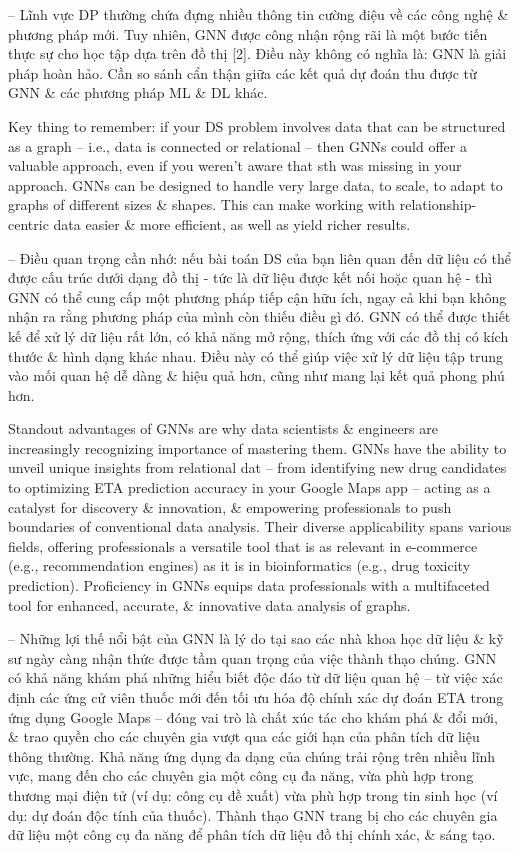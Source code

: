 \documentclass{article}
\begin{document}
\begin{itemize}
    -- Lĩnh vực DP thường chứa đựng nhiều thông tin cường điệu về các công nghệ \& phương pháp mới. Tuy nhiên, GNN được công nhận rộng rãi là một bước tiến thực sự cho học tập dựa trên đồ thị [2]. Điều này không có nghĩa là: GNN là giải pháp hoàn hảo. Cần so sánh cẩn thận giữa các kết quả dự đoán thu được từ GNN \& các phương pháp ML \& DL khác.

    Key thing to remember: if your DS problem involves data that can be structured as a graph -- i.e., data is connected or relational -- then GNNs could offer a valuable approach, even if you weren't aware that sth was missing in your approach. GNNs can be designed to handle very large data, to scale, to adapt to graphs of different sizes \& shapes. This can make working with relationship-centric data easier \& more efficient, as well as yield richer results.

    -- Điều quan trọng cần nhớ: nếu bài toán DS của bạn liên quan đến dữ liệu có thể được cấu trúc dưới dạng đồ thị - tức là dữ liệu được kết nối hoặc quan hệ - thì GNN có thể cung cấp một phương pháp tiếp cận hữu ích, ngay cả khi bạn không nhận ra rằng phương pháp của mình còn thiếu điều gì đó. GNN có thể được thiết kế để xử lý dữ liệu rất lớn, có khả năng mở rộng, thích ứng với các đồ thị có kích thước \& hình dạng khác nhau. Điều này có thể giúp việc xử lý dữ liệu tập trung vào mối quan hệ dễ dàng \& hiệu quả hơn, cũng như mang lại kết quả phong phú hơn.

    Standout advantages of GNNs are why data scientists \& engineers are increasingly recognizing importance of mastering them. GNNs have the ability to unveil unique insights from relational dat -- from identifying new drug candidates to optimizing ETA prediction accuracy in your Google Maps app -- acting as a catalyst for discovery \& innovation, \& empowering professionals to push boundaries of conventional data analysis. Their diverse applicability spans various fields, offering professionals a versatile tool that is as relevant in e-commerce (e.g., recommendation engines) as it is in bioinformatics (e.g., drug toxicity prediction). Proficiency in GNNs equips data professionals with a multifaceted tool for enhanced, accurate, \& innovative data analysis of graphs.

    -- Những lợi thế nổi bật của GNN là lý do tại sao các nhà khoa học dữ liệu \& kỹ sư ngày càng nhận thức được tầm quan trọng của việc thành thạo chúng. GNN có khả năng khám phá những hiểu biết độc đáo từ dữ liệu quan hệ -- từ việc xác định các ứng cử viên thuốc mới đến tối ưu hóa độ chính xác dự đoán ETA trong ứng dụng Google Maps -- đóng vai trò là chất xúc tác cho khám phá \& đổi mới, \& trao quyền cho các chuyên gia vượt qua các giới hạn của phân tích dữ liệu thông thường. Khả năng ứng dụng đa dạng của chúng trải rộng trên nhiều lĩnh vực, mang đến cho các chuyên gia một công cụ đa năng, vừa phù hợp trong thương mại điện tử (ví dụ: công cụ đề xuất) vừa phù hợp trong tin sinh học (ví dụ: dự đoán độc tính của thuốc). Thành thạo GNN trang bị cho các chuyên gia dữ liệu một công cụ đa năng để phân tích dữ liệu đồ thị chính xác, \& sáng tạo.


\end{itemize}
\end{document}
